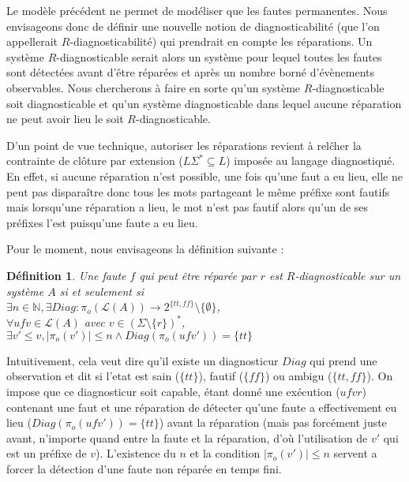 \documentclass[a4paper,10pt]{article}
\newtheorem{mydef}{D\'efinition}
\begin{document}
Le mod\`ele pr\'ec\'edent ne permet de mod\'eliser que les fautes permanentes. Nous envisageons donc de d\'efinir une nouvelle notion de diagnosticabilit\'e (que l'on appellerait $R$-diagnosticabilit\'e) qui prendrait en compte les r\'eparations. Un syst\`eme $R$-diagnosticable serait alors un syst\`eme pour lequel toutes les fautes sont d\'etect\'ees avant d'\^etre r\'epar\'ees et apr\`es un nombre born\'e d'\'ev\`enements observables. Nous chercherons \`a faire en sorte qu'un syst\`eme $R$-diagnosticable soit diagnosticable et qu'un syst\`eme diagnosticable dans lequel aucune r\'eparation ne peut avoir lieu le soit $R$-diagnosticable.

D'un point de vue technique, autoriser les r\'eparations revient \`a rel\^cher la contrainte de cl\^oture par extension ($L\Sigma^*\subseteq L$) impos\'ee au langage diagnostiqu\'e. En effet, si aucune r\'eparation n'est possible, une fois qu'une faut a eu lieu, elle ne peut pas dispara\^itre donc tous les mots partageant le m\^eme pr\'efixe sont fautifs mais lorsqu'une r\'eparation a lieu, le mot n'est pas fautif alors qu'un de ses pr\'efixes l'est puisqu'une faute a eu lieu.

Pour le moment, nous envisageons la d\'efinition suivante :

\begin{mydef}
  Une faute $f$ qui peut \^etre r\'epar\'ee par $r$ est $R$-diagnosticable sur un syst\`eme $A$ si et seulement si\\
  $\exists n \in \mathbb N,\exists Diag : \pi_o(\mathcal L(A)) \to 2^{\{tt, ff\}}\setminus \{\emptyset\}$,\\
  $\forall ufv\in \mathcal L(A)$ avec $v\in \left(\Sigma\setminus \{r\}\right)^*$,\\
  $\exists v'\le v, |\pi_o(v')| \le n \land Diag(\pi_o(ufv'))=\{tt\}$
\end{mydef}

Intuitivement, cela veut dire qu'il existe un diagnosticur $Diag$ qui prend une observation et dit si l'etat est sain ($\{tt\}$), fautif ($\{ff\}$) ou ambigu ($\{tt, ff\}$). On impose que ce diagnosticur soit capable, \'etant donn\'e une ex\'ecution ($ufvr$) contenant une faut et une r\'eparation de d\'etecter qu'une faute a effectivement eu lieu ($Diag(\pi_o(ufv'))=\{tt\}$) avant la r\'eparation (mais pas forc\'ement juste avant, n'importe quand entre la faute et la r\'eparation, d'o\`u l'utilisation de $v'$ qui est un pr\'efixe de $v$). L'existence du $n$ et la condition $|\pi_o(v')| \le n$ servent a forcer la d\'etection d'une faute non r\'epar\'ee en temps fini.
\end{document}
